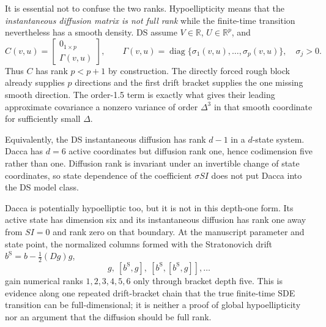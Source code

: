 \documentclass[11pt]{article}
\begin{document}
It is essential not to confuse the two ranks.  Hypoellipticity means that the
\emph{instantaneous diffusion matrix is not full rank} while the finite-time
transition nevertheless has a smooth density.  DS assume
$V\in\mathbb R$, $U\in\mathbb R^p$, and
\[
 C(v,u)=\begin{bmatrix}0_{1\times p}\\\Gamma(v,u)\end{bmatrix},
 \qquad
 \Gamma(v,u)=\operatorname{diag}\{\sigma_1(v,u),\ldots,
 \sigma_p(v,u)\},\quad \sigma_j>0.
\]
Thus $C$ has rank $p<p+1$ by construction.  The directly forced rough block
already supplies $p$ directions and the first drift bracket supplies the one
missing smooth direction.  The order-1.5 term is exactly what gives their
leading approximate covariance a nonzero variance of order $\Delta^3$ in that
smooth coordinate for sufficiently small $\Delta$.

Equivalently, the DS instantaneous diffusion has rank $d-1$ in a $d$-state
system.  Dacca has $d=6$ active coordinates but diffusion rank one, hence
codimension five rather than one.  Diffusion rank is invariant under an
invertible change of state coordinates, so state dependence of the coefficient
$\sigma SI$ does not put Dacca into the DS model class.

Dacca is potentially hypoelliptic too, but it is not in this depth-one form.
Its active state has dimension six and its instantaneous diffusion has rank one
away from $SI=0$ and rank zero on that boundary.  At the manuscript parameter
and state point, the normalized columns formed with the
Stratonovich drift $b^{\mathrm S}=b-\tfrac12(Dg)g$,
\[
 g,\ [b^{\mathrm S},g],\ [b^{\mathrm S},[b^{\mathrm S},g]],\ldots
\]
gain numerical ranks $1,2,3,4,5,6$ only through bracket depth five.  This is
evidence along one repeated drift-bracket chain that the true finite-time SDE
transition can be full-dimensional; it is neither a proof of global
hypoellipticity nor an argument that the diffusion should be full rank.
\end{document}

